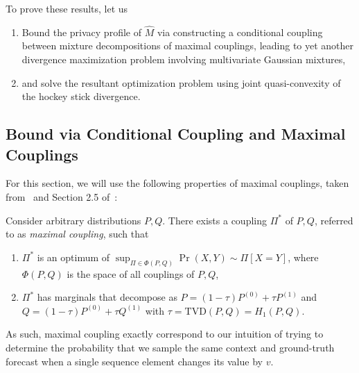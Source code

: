 To prove these results, let us
\begin{enumerate}
    \item Bound the privacy profile of $\hat{M}$ via constructing a conditional coupling between mixture decompositions of maximal couplings, leading to yet another divergence maximization problem involving multivariate Gaussian mixtures,
    \item and solve the resultant optimization problem using joint quasi-convexity of the hockey stick divergence.
\end{enumerate}

\subsection{Bound via Conditional Coupling and Maximal Couplings}
For this section, we will use the following properties of maximal couplings, taken from~\cite{balle2018privacy} and Section 2.5 of~\cite{den2012probability}:
\begin{proposition}
    Consider arbitrary distributions $P, Q$.
    There exists a coupling $\Pi^*$ of $P, Q$, referred to as \emph{maximal coupling}, such that
    \begin{enumerate}
        \item $\Pi^*$ is an optimum of $\sup_{\Pi \in \Phi(P,Q)} \Pr{(X,Y) \sim \Pi}[X = Y]$, where $\Phi(P, Q)$ is the space of all couplings of $P, Q$,
        \item $\Pi^*$ has marginals that decompose as $P = (1-\tau) P^{(0)} + \tau P^{(1)}$ and $Q = (1-\tau) P^{(0)} + \tau Q^{(1)}$
        with $\tau = \mathrm{TVD}(P, Q) = H_1(P,Q)$.
    \end{enumerate}
\end{proposition}
As such, maximal coupling exactly correspond to our intuition of trying to determine the probability
that we sample the same context and ground-truth forecast when a single sequence element changes its value  by $v$.
